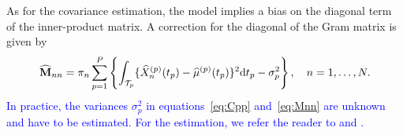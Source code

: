 As for the covariance estimation, the model implies a bias on the diagonal term of the inner-product matrix. A correction for the diagonal of the Gram matrix is given by
\begin{equation}\label{eq:Mnn}
    \widehat{\mathbf{M}}_{nn} = \pi_n\sum_{p = 1}^P \left\{\int_{\mathcal{T}_{p}}\{\widehat{X}_n^{(p)}(t_p) - \widehat{\mu}^{(p)}(t_p)\}^2 {\rm d} t_p - \sigma_p^2 \right\}, \quad n = 1, \dots, N.
\end{equation}
\textcolor{blue}{In practice, the variances $\sigma_p^2$ in equations~\eqref{eq:Cpp} and~\eqref{eq:Mnn} are unknown and have to be estimated. For the estimation, we refer the reader to \cite{hallVarianceEstimationNonparametric1990} and \cite{hallAsymptoticallyOptimalDifferenceBased1990}.}


